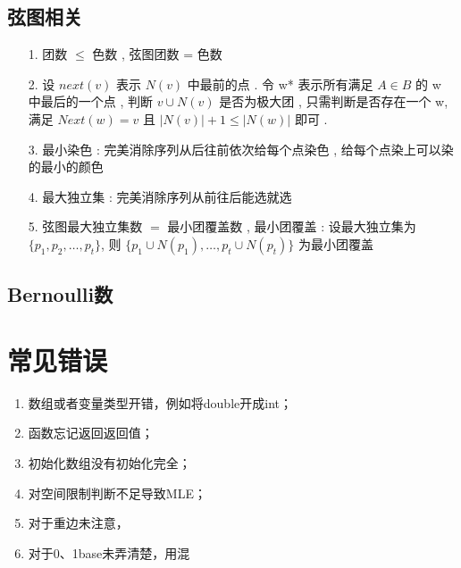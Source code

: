 \documentclass[a4paper]{article}
\begin{document}
\subsection{弦图相关}
\begin{enumerate}
	\item[1.] 团数 $\leq$ 色数 , 弦图团数 = 色数
	\item[2.] 设 $next(v)$ 表示 $N(v)$ 中最前的点 . 
	令 w* 表示所有满足 $A \in B$ 的 w 中最后的一个点 , 
	判断 $v \cup N(v)$ 是否为极大团 , 
	只需判断是否存在一个 w, 
	满足 $Next(w)=v$ 且 $|N(v)| + 1 \leq |N(w)|$ 即可 . 
	\item[3.] 最小染色 : 完美消除序列从后往前依次给每个点染色 , 
	给每个点染上可以染的最小的颜色
	\item[4.] 最大独立集 : 完美消除序列从前往后能选就选
	\item[5.] 弦图最大独立集数 $=$ 最小团覆盖数 , 
	最小团覆盖 : 
	设最大独立集为 $\{p_1,p_2, \dots ,p_t\}$, 
	则 $\{p_1\cup N(p_1), \dots , p_t \cup N(p_t)\}$ 
	为最小团覆盖
\end{enumerate}

\subsection{Bernoulli数}

\section{常见错误}

\begin{spacing}{0.6}
	\begin{enumerate}
		\item 数组或者变量类型开错，例如将double开成int；
		\item 函数忘记返回返回值；
		\item 初始化数组没有初始化完全；
		\item 对空间限制判断不足导致MLE；
		\item 对于重边未注意，
		\item 对于0、1base未弄清楚，用混
	\end{enumerate}
\end{spacing}
\end{document}
